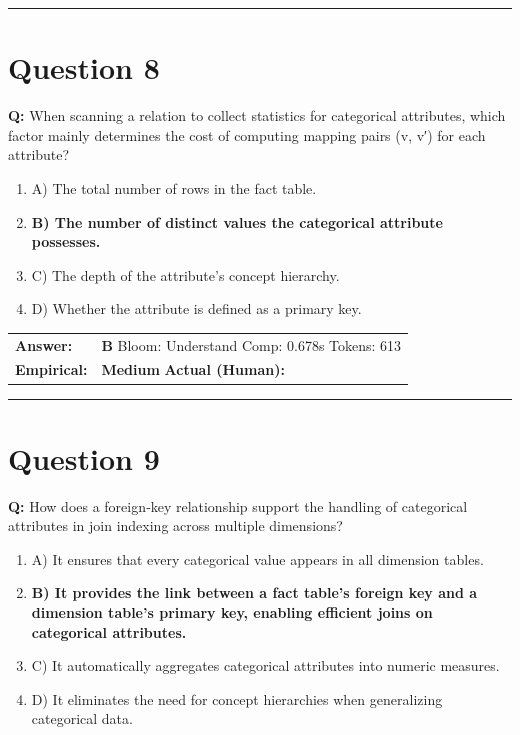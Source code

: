 \documentclass[9pt]{article}
\begin{document}
\vspace{0.2cm}
\rule{\textwidth}{0.4pt}
\vspace{0.2cm}


\section*{Question 8}

\textbf{Q:} When scanning a relation to collect statistics for categorical attributes, which factor mainly determines the cost of computing mapping pairs (v, v′) for each attribute?

\begin{enumerate}[label=\textbf{\alph{*})}, nosep]
    \item A) The total number of rows in the fact table.
    \item \textbf{B) The number of distinct values the categorical attribute possesses.} %
    \item C) The depth of the attribute’s concept hierarchy.
    \item D) Whether the attribute is defined as a primary key.

\end{enumerate}

\begin{tabular}{@{}l p{10.5cm}@{}}
\textbf{Answer:} & \textbf{B} \hspace{1em} Bloom: Understand \hspace{1em} Comp: 0.678s \hspace{1em} Tokens: 613 \\
\textbf{Empirical:} & \textbf{Medium} \hspace{1em} \textbf{Actual (Human):} \underline{\hspace{5cm}}
\end{tabular}

\vspace{0.2cm}
\rule{\textwidth}{0.4pt}
\vspace{0.2cm}


\section*{Question 9}

\textbf{Q:} How does a foreign‑key relationship support the handling of categorical attributes in join indexing across multiple dimensions?

\begin{enumerate}[label=\textbf{\alph{*})}, nosep]
    \item A) It ensures that every categorical value appears in all dimension tables.
    \item \textbf{B) It provides the link between a fact table’s foreign key and a dimension table’s primary key, enabling efficient joins on categorical attributes.} %
    \item C) It automatically aggregates categorical attributes into numeric measures.
    \item D) It eliminates the need for concept hierarchies when generalizing categorical data.

\end{enumerate}
\end{document}
